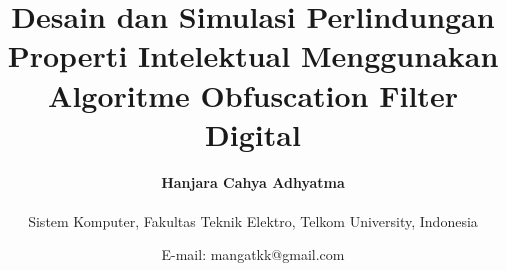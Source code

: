 \title{\textbf{Desain dan Simulasi Perlindungan Properti Intelektual Menggunakan Algoritme Obfuscation Filter Digital}}
\author{\textbf{Hanjara Cahya Adhyatma}\\
	\vspace{0.5pt}\\
	Sistem Komputer, Fakultas Teknik Elektro, Telkom University, Indonesia
}
\date{E-mail: mangatkk@gmail.com}